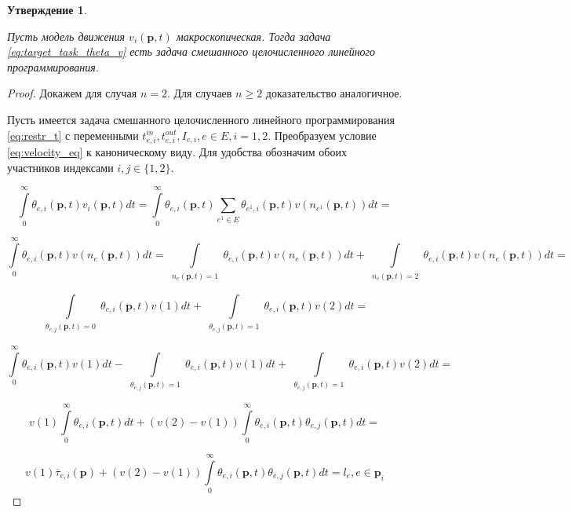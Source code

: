 \documentclass[12pt, a4paper]{article}
\newtheorem{state}{Утверждение}[section]
\begin{document}
\begin{state}
	
	\label{state:lin_prog}
	
	Пусть модель движения $ v_i(\textbf{p}, t)$ макроскопическая. Тогда задача \eqref{eq:target_task_theta_v} есть задача смешанного целочисленного линейного программирования.
\end{state}

\begin{proof}
	Докажем для случая $n = 2$. Для случаев $n \ge 2$ доказательство аналогичное.
	
	Пусть имеется задача смешанного целочисленного линейного программирования \eqref{eq:restr_t} с переменными $t_{e, i}^{in}, t_{e, i}^{out}, I_{e, i}, e \in E, i = 1, 2$. Преобразуем условие \eqref{eq:velocity_eq} к каноническому виду. Для удобства обозначим обоих участников индексами $i, j \in \{1, 2\}$.
	
	$$\int\limits_{0}^{\infty} \theta_{e, i} (\textbf{p}, t) v_i(\textbf{p}, t)dt = \int\limits_{0}^{\infty} \theta_{e, i} (\textbf{p}, t) \sum \limits _{e^1 \in E} \theta_{e^1, i} (\textbf{p}, t) v (n_{e^1} (\textbf{p}, t)) dt = $$
	
	$$\int\limits_{0}^{\infty} \theta_{e, i} (\textbf{p}, t)  v (n_{e} (\textbf{p}, t)) dt = 
	  \int\limits_{ \substack{n_{e} (\textbf{p}, t) = 1}} \theta_{e, i} (\textbf{p}, t)  v (n_{e} (\textbf{p}, t)) dt +
	  \int\limits_{ \substack{n_{e} (\textbf{p}, t) = 2}} \theta_{e, i} (\textbf{p}, t)  v (n_{e} (\textbf{p}, t)) dt = $$
	
	$$\int\limits_{ \substack{\theta_{e, j} (\textbf{p}, t) = 0}} \theta_{e, i} (\textbf{p}, t)  v (1) dt +
	  \int\limits_{ \substack{\theta_{e, j} (\textbf{p}, t) = 1}} \theta_{e, i} (\textbf{p}, t)  v (2) dt = $$
	  
    $$\int\limits_{0}^{\infty} \theta_{e, i} (\textbf{p}, t)  v (1) dt - 
      \int\limits_{ \substack{\theta_{e, j} (\textbf{p}, t) = 1}} \theta_{e, i} (\textbf{p}, t)  v (1) dt +
	  \int\limits_{ \substack{\theta_{e, j} (\textbf{p}, t) = 1}} \theta_{e, i} (\textbf{p}, t)  v (2) dt = $$
	  
	$$v (1) \int\limits_{0}^{\infty} \theta_{e, i} (\textbf{p}, t) dt +
	  (v (2) - v(1)) \int\limits_{0}^{\infty} \theta_{e, i} (\textbf{p}, t) \theta_{e, j} (\textbf{p}, t) dt = $$
	  
    $$v (1) \overline{\tau}_{e, i} (\textbf{p}) +
    (v (2) - v(1)) \int\limits_{0}^{\infty} \theta_{e, i} (\textbf{p}, t) \theta_{e, j} (\textbf{p}, t) dt = l_e, e \in \textbf{p}_i$$
	  

\end{proof}
\end{document}
